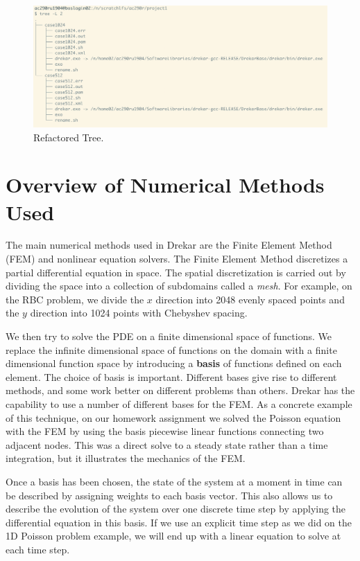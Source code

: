 \documentclass[11pt]{article} %
\begin{document}
\begin{figure}[h!]
\centering
\hspace*{-0.25in}
\includegraphics[width=\textwidth]{refactor.png}
\caption{Refactored Tree.}
\end{figure}


\section{Overview of Numerical Methods Used}
The main numerical methods used in Drekar are the Finite Element Method (FEM)
and nonlinear equation solvers.
The Finite Element Method discretizes a partial differential equation in space.
The spatial discretization is carried out by dividing the space into a collection of
subdomains called a \textit{mesh}.  
For example, on the RBC problem, we divide the $x$ direction into 2048 evenly spaced
points and the $y$ direction into 1024 points with Chebyshev spacing.

We then try to solve the PDE on a finite dimensional space of functions.
We replace the infinite dimensional space of functions on the domain with a finite
dimensional function space by introducing a \textbf{basis} of functions defined on each element.
The choice of basis is important.  
Different bases give rise to different methods, and some work better on different problems than others.
Drekar has the capability to use a number of different bases for the FEM.
As a concrete example of this technique, on our homework assignment we solved the Poisson
equation with the FEM by using the basis piecewise linear functions 
connecting two adjacent nodes.  
This was a direct solve to a steady state rather than a time integration,
but it illustrates the mechanics of the FEM.

Once a basis has been chosen, the state of the system at a moment in time
can be described by assigning weights to each basis vector.  
This also allows us to describe the evolution of the system over one discrete
time step by applying the differential equation in this basis.
If we use an explicit time step as we did on the 1D Poisson problem
example, we will end up with a linear equation to solve at each time step.
\end{document}
